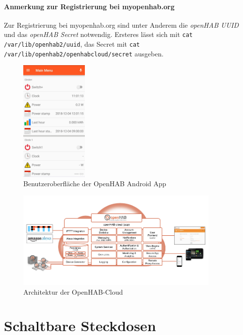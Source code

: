 \paragraph{Anmerkung zur Registrierung bei myopenhab.org}

Zur Registrierung bei myopenhab.org sind unter Anderem die \textit{openHAB UUID} und das \textit{openHAB Secret} notwendig. Ersteres lässt sich mit \texttt{cat /var/lib/openhab2/uuid}, das Secret mit \texttt{cat /var/lib/openhab2/openhabcloud/secret} ausgeben.


\begin{figure}[H]
	\centering
	\includegraphics[width=0.3\textwidth]{Bilder/App}
	\caption{Benutzeroberfläche der OpenHAB Android App}
	\label{fig:ohCloud}
\end{figure}

\begin{figure}[H]
	\centering
	\includegraphics[width=0.9\textwidth]{Bilder/openHAB-Cloud}
	\caption{Architektur der OpenHAB-Cloud}
	\label{fig:ohApp}
\end{figure}

\newpage


\section{Schaltbare Steckdosen}
